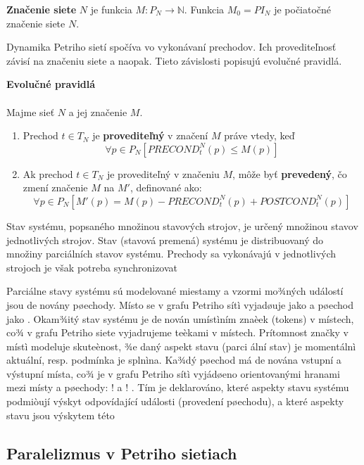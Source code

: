 \begin{defn}
	\textbf{Značenie siete} $N$ je funkcia $M : P_N \longrightarrow \mathbb{N}$. Funkcia $M_0 = PI_N$ je počiatočné značenie siete $N$.
	
\end{defn}

	Dynamika Petriho sietí spočíva vo vykonávaní prechodov. Ich provediteľnosť závisí na značeniu siete a naopak. Tieto závislosti popisujú evolučné pravidlá.
	
\begin{defn}
	\textbf{Evolučné pravidlá} \\\\ Majme sieť $N$ a jej značenie $M$.
	\begin{enumerate}
		\item Prechod $t \in T_N$ je \textbf{provediteľný} v značení $M$ práve vtedy, keď
		$$ \forall p \in P_N [PRECOND_t^N(p) \leq M(p) ]$$
		\item Ak prechod $t \in T_N$ je provediteľný v značeniu $M$, môže byť \textbf{prevedený}, čo zmení značenie $M$ na $M'$, definované ako:
		$$\forall p \in P_N [M'(p)=M(p) - PRECOND_t^N(p) + POSTCOND_t^N(p) ]$$ 
	\end{enumerate}
\end{defn}  



Stav systému, popsaného množinou stavových strojov, je určený množinou stavov jednotlivých strojov. Stav (stavová premená) systému je distribuovaný do množiny parciálních stavov systému. Prechody sa vykonávajú v jednotlivých strojoch je však potreba synchronizovat

Parciálne stavy systému sú modelované miestamy a vzormi mo¾ných událostí jsou denovány
pøechody. Místo se v grafu Petriho sítì vyjadøuje jako 
 a pøechod jako . Okam¾itý stav
systému je denován umístìním znaèek (tokens) v místech, co¾ v grafu Petriho siete vyjadrujeme
teèkami v místech. Prítomnost značky v místì modeluje skuteènost, ¾e daný aspekt stavu (parci
ální stav) je momentálnì aktuální, resp. podmínka je splnìna. Ka¾dý pøechod má denována
vstupní a výstupní místa, co¾ je v grafu Petriho sítì vyjádøeno orientovanými hranami mezi
místy a pøechody: 
! a !
. Tím je deklarováno, které aspekty stavu systému podmiòují
výskyt odpovídající události (provedení pøechodu), a které aspekty stavu jsou výskytem této

\subsection{Paralelizmus v Petriho sietiach}

